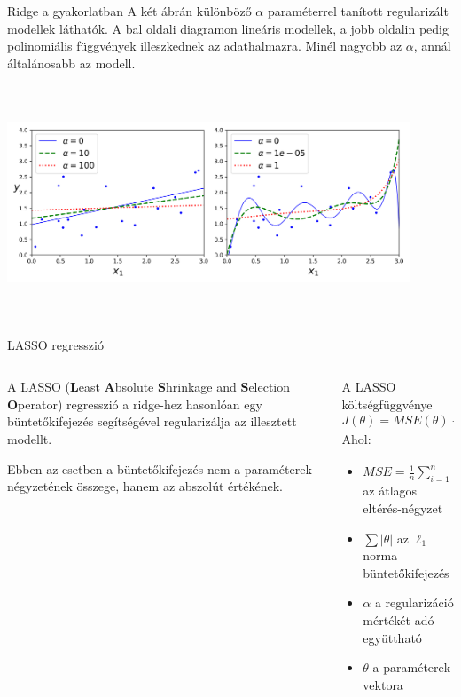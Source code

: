 \documentclass[english, aspectratio=169]{beamer}
\begin{document}
\begin{frame}{Ridge a gyakorlatban}
A két ábrán különböző $\alpha$ paraméterrel tanított regularizált modellek láthatók. A bal oldali diagramon lineáris modellek, a jobb oldalin pedig polinomiális függvények illeszkednek az adathalmazra. Minél nagyobb az $\alpha$, annál általánosabb az modell.\par\medskip
\begin{center}
\includegraphics[width=12cm, height=7cm, keepaspectratio]{images/regularization_11.png}
\end{center}
\end{frame}

\begin{frame}{LASSO regresszió}
\begin{columns}
\begin{column}{.5\textwidth}
A LASSO (\textbf{L}east \textbf{A}bsolute \textbf{S}hrinkage and \textbf{S}election \textbf{O}perator) regresszió a ridge-hez hasonlóan egy büntetőkifejezés segítségével regularizálja az illesztett modellt.\par\medskip
Ebben az esetben a büntetőkifejezés nem a paraméterek négyzetének összege, hanem az abszolút értékének.
\end{column}
\begin{column}{.5\textwidth}
\begin{block}{A LASSO költségfüggvénye}
\[
J\left( \theta \right) = MSE\left( \theta \right) + \alpha \sum \left|\theta\right|
\]
Ahol: 
\begin{itemize}
	\item $MSE=\frac{1}{n} \sum_{i=1}^n \left( y_i - \hat{y}_i \right)^2$ az átlagos eltérés-négyzet
	\item $\sum \left|\theta\right|$ az $\ell_1$ norma büntetőkifejezés
	\item $\alpha$ a regularizáció mértékét adó együttható
	\item $\theta$ a paraméterek vektora
\end{itemize}
\end{block}
\end{column}
\end{columns}
\end{frame}
\end{document}
